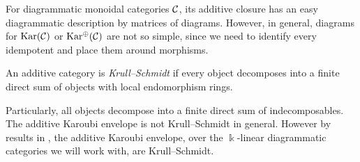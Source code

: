 For diagrammatic monoidal categories $\mathcal{C}$, its additive closure has an easy diagrammatic description by matrices of diagrams. However, in general, diagrams for $\operatorname{Kar}(\mathcal{C})$ or $\operatorname{Kar^\oplus}(\mathcal{C})$ are not so simple, since we need to identify every idempotent and place them around morphisms.

\begin{definition}
    An additive category is \textit{Krull--Schmidt} if every object decomposes into a finite direct sum of objects with local endomorphism rings.
\end{definition}

Particularly, all objects decompose into a finite direct sum of indecomposables. The additive Karoubi envelope is not Krull--Schmidt in general. However by results in \cite[Secition 11.3 Appendix 1]{intro-soergel-bimodules}, the additive Karoubi envelope, over the $\Bbbk$-linear diagrammatic categories we will work with, are Krull--Schmidt.

